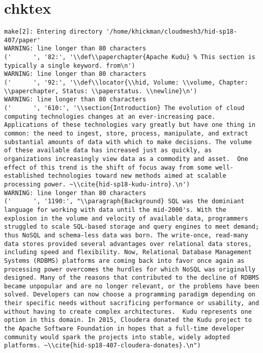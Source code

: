 \appendix
\section{chktex}
\begin{tiny}
\begin{verbatim}
make[2]: Entering directory '/home/khickman/cloudmesh3/hid-sp18-407/paper'
WARNING: line longer than 80 characters
('      ', '82:', '\\def\\paperchapter{Apache Kudu} % This section is typically a single keyword. from\n')
WARNING: line longer than 80 characters
('      ', '92:', '\\def\\locator{\\hid, Volume: \\volume, Chapter: \\paperchapter, Status: \\paperstatus. \\newline}\n')
WARNING: line longer than 80 characters
('      ', '610:', '\\section{Introduction} The evolution of cloud computing technologies changes at an ever-increasing pace. Applications of these technologies vary greatly but have one thing in common: the need to ingest, store, process, manipulate, and extract substantial amounts of data with which to make decisions. The volume of these available data has increased just as quickly, as organizations increasingly view data as a commodity and asset.  One effect of this trend is the shift of focus away from some well-established technologies toward new methods aimed at scalable processing power. ~\\cite{hid-sp18-kudu-intro}.\n')
WARNING: line longer than 80 characters
('      ', '1190:', "\\paragraph{Background} SQL was the dominiant language for working with data until the mid-2000's. With the explosion in the volume and velocity of available data, programmers struggled to scale SQL-based storage and query engines to meet demand; thus NoSQL and schema-less data was born. The write-once, read-many data stores provided several advantages over relational data stores, including speed and flexibility. Now, Relational Database Management Systems (RDBMS) platforms are coming back into favor once again as processing power overcomes the hurdles for which NoSQL was originally designed. Many of the reasons that contributed to the decline of RDBMS became unpopular and are no longer relevant, or the problems have been solved. Developers can now choose a programming paradigm depending on their specific needs without sacrificing performance or usability, and without having to create complex architectures.  Kudu represents one option in this domain. In 2015, Cloudera donated the Kudu project to the Apache Software Foundation in hopes that a full-time developer community would spark the projects into stable, widely adopted platforms. ~\\cite{hid-sp18-407-cloudera-donates}.\n")

\end{verbatim}
\end{tiny}
